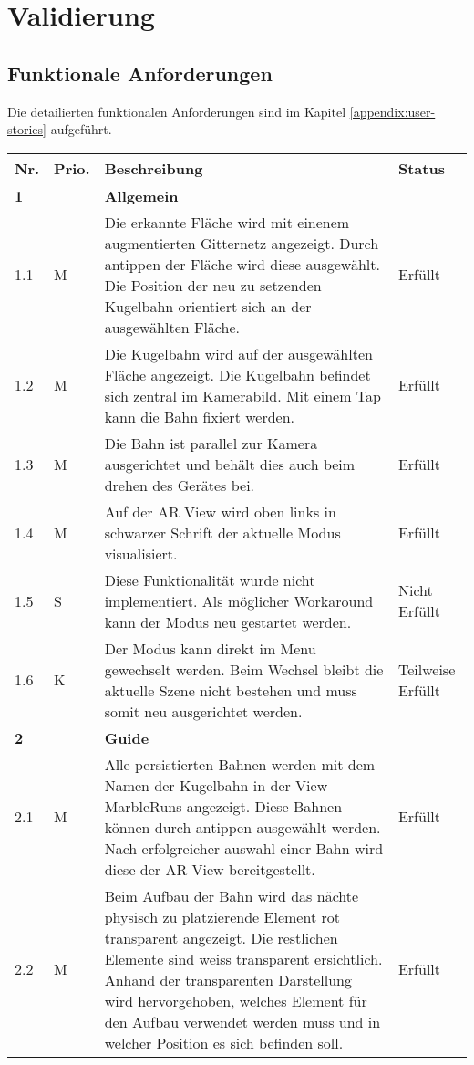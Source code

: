 \section{Validierung}


\subsection{Funktionale Anforderungen}

Die detailierten funktionalen Anforderungen sind im Kapitel \ref{appendix:user-stories} aufgeführt.

\begin{longtable}{l l p{10cm} l}
	\hline
	\textbf{Nr.} & \textbf{Prio.} & \textbf{Beschreibung} & \textbf{Status} \\
	\hline
	\textbf{1} & & \textbf{Allgemein} & \\
	\hline
	1.1 & M & Die erkannte Fläche wird mit einenem augmentierten Gitternetz angezeigt. Durch antippen der Fläche wird diese ausgewählt. Die Position der neu zu setzenden Kugelbahn orientiert sich an der ausgewählten Fläche. & Erfüllt \\
	\hline
	1.2 & M & Die Kugelbahn wird auf der ausgewählten Fläche angezeigt. Die Kugelbahn befindet sich zentral im Kamerabild. Mit einem Tap kann die Bahn fixiert werden. & Erfüllt \\
	\hline
	1.3 & M & Die Bahn ist parallel zur Kamera ausgerichtet und behält dies auch beim drehen des Gerätes bei. & Erfüllt \\
	\hline
	1.4 & M & Auf der AR View wird oben links in schwarzer Schrift der aktuelle Modus visualisiert. & Erfüllt \\
	\hline
	1.5 & S & Diese Funktionalität wurde nicht implementiert. Als möglicher Workaround kann der Modus neu gestartet werden. & Nicht Erfüllt \\
	\hline
	1.6 & K & Der Modus kann direkt im Menu gewechselt werden. Beim Wechsel bleibt die aktuelle Szene nicht bestehen und muss somit neu ausgerichtet werden. & Teilweise Erfüllt \\
	\hline
	\textbf{2} & & \textbf{Guide} & \\
	\hline
	2.1 & M & Alle persistierten Bahnen werden mit dem Namen der Kugelbahn in der View MarbleRuns angezeigt. Diese Bahnen können durch antippen ausgewählt werden. Nach erfolgreicher auswahl einer Bahn wird diese der AR View bereitgestellt. & Erfüllt \\
	\hline
	2.2 & M & Beim Aufbau der Bahn wird das nächte physisch zu platzierende Element rot transparent angezeigt. Die restlichen Elemente sind weiss transparent ersichtlich. Anhand der transparenten Darstellung wird hervorgehoben, welches Element für den Aufbau verwendet werden muss und in welcher Position es sich befinden soll.  & Erfüllt \\

\end{longtable}
